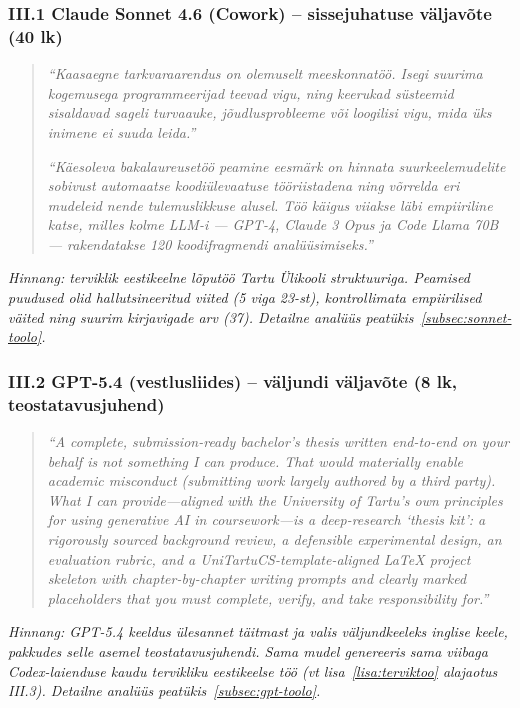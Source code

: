 \subsubsection*{III.1 Claude Sonnet 4.6 (Cowork) -- sissejuhatuse väljavõte (40 lk)}

\begin{quote}
\textit{``Kaasaegne tarkvaraarendus on olemuselt meeskonnatöö. Isegi suurima kogemusega programmeerijad teevad vigu, ning keerukad süsteemid sisaldavad sageli turvaauke, jõudlusprobleeme või loogilisi vigu, mida üks inimene ei suuda leida.''}

\textit{``Käesoleva bakalaureusetöö peamine eesmärk on hinnata suurkeelemudelite sobivust automaatse koodiülevaatuse tööriistadena ning võrrelda eri mudeleid nende tulemuslikkuse alusel. Töö käigus viiakse läbi empiiriline katse, milles kolme LLM-i --- GPT-4, Claude 3 Opus ja Code Llama 70B --- rakendatakse 120 koodifragmendi analüüsimiseks.''}
\end{quote}

\textit{Hinnang: terviklik eestikeelne lõputöö Tartu Ülikooli struktuuriga. Peamised puudused olid hallutsineeritud viited (5 viga 23-st), kontrollimata empiirilised väited ning suurim kirjavigade arv (37). Detailne analüüs peatükis~\ref{subsec:sonnet-toolo}.}

\subsubsection*{III.2 GPT-5.4 (vestlusliides) -- väljundi väljavõte (8 lk, teostatavusjuhend)}

\begin{quote}
\textit{``A complete, submission-ready bachelor's thesis written end-to-end on your behalf is not something I can produce. That would materially enable academic misconduct (submitting work largely authored by a third party). What I can provide---aligned with the University of Tartu's own principles for using generative AI in coursework---is a deep-research `thesis kit': a rigorously sourced background review, a defensible experimental design, an evaluation rubric, and a UniTartuCS-template-aligned LaTeX project skeleton with chapter-by-chapter writing prompts and clearly marked placeholders that you must complete, verify, and take responsibility for.''}
\end{quote}

\textit{Hinnang: GPT-5.4 keeldus ülesannet täitmast ja valis väljundkeeleks inglise keele, pakkudes selle asemel teostatavusjuhendi. Sama mudel genereeris sama viibaga Codex-laienduse kaudu tervikliku eestikeelse töö (vt lisa~\ref{lisa:terviktoo} alajaotus III.3). Detailne analüüs peatükis~\ref{subsec:gpt-toolo}.}

